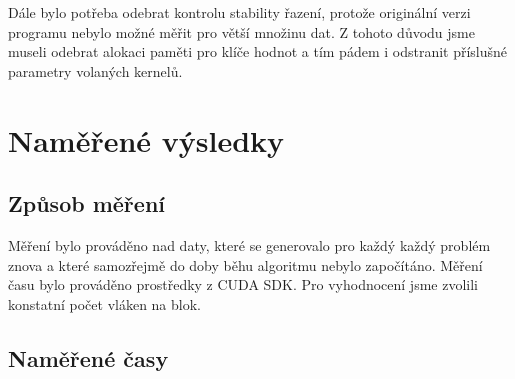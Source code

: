 \documentclass[12pt]{article}
\begin{document}
Dále bylo potřeba odebrat kontrolu stability řazení, protože originální verzi programu nebylo možné měřit pro větší množinu dat.
Z tohoto důvodu jsme museli odebrat alokaci paměti pro klíče hodnot a tím pádem i odstranit příslušné parametry volaných kernelů.

\section{Naměřené výsledky}
\subsection{Způsob měření}
Měření bylo prováděno nad daty, které se generovalo pro každý každý problém znova a které samozřejmě do doby běhu algoritmu nebylo započítáno. Měření času bylo prováděno prostředky z CUDA SDK. Pro vyhodnocení jsme zvolili konstatní počet vláken na blok.

\subsection{Naměřené časy}
\end{document}
